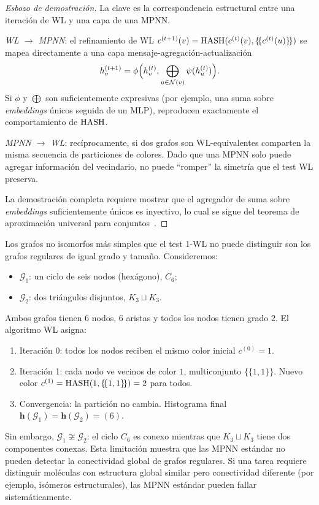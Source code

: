 \begin{proof}[Esbozo de demostraci\'on]
La clave es la correspondencia estructural entre una iteraci\'on de WL y una capa
de una MPNN.

\emph{WL $\to$ MPNN}: el refinamiento de WL
$c^{(t+1)}(v) = \operatorname{HASH}(c^{(t)}(v), \{\!\{c^{(t)}(u)\}\!\})$ se mapea directamente a
una capa mensaje-agregaci\'on-actualizaci\'on
\[
  h_v^{(t+1)} = \phi\Bigl(h_v^{(t)},
      \bigoplus_{u \in \mathcal{N}(v)} \psi(h_u^{(t)})\Bigr).
\]
Si $\phi$ y $\bigoplus$ son suficientemente expresivas (por ejemplo, una suma
sobre \emph{embeddings} \'unicos seguida de un MLP), reproducen exactamente el
comportamiento de $\operatorname{HASH}$.

\emph{MPNN $\to$ WL}: rec\'iprocamente, si dos grafos son WL-equivalentes
comparten la misma secuencia de particiones de colores. Dado que una MPNN solo
puede agregar informaci\'on del vecindario, no puede ``romper'' la simetr\'ia que
el test WL preserva.

La demostraci\'on completa requiere mostrar que el agregador de suma sobre
\emph{embeddings} suficientemente \'unicos es inyectivo, lo cual se sigue del
teorema de aproximaci\'on universal para conjuntos~\citep{zaheer2017deepsets}.
\qedhere
\end{proof}

\begin{example}
\label{ex:priors:wl-indistinguishable}
Los grafos no isomorfos m\'as simples que el test 1-WL no puede distinguir son los
grafos regulares de igual grado y tama\~no. Consideremos:
\begin{itemize}
\item $\mathcal{G}_1$: un ciclo de seis nodos (hex\'agono), $C_6$;
\item $\mathcal{G}_2$: dos tri\'angulos disjuntos, $K_3 \sqcup K_3$.
\end{itemize}
Ambos grafos tienen $6$ nodos, $6$ aristas y todos los nodos tienen grado $2$. El
algoritmo WL asigna:
\begin{enumerate}
\item Iteraci\'on 0: todos los nodos reciben el mismo color inicial
$c^{(0)} = 1$.
\item Iteraci\'on 1: cada nodo ve vecinos de color $1$, multiconjunto
$\{\!\{1, 1\}\!\}$. Nuevo color $c^{(1)} = \operatorname{HASH}(1, \{\!\{1, 1\}\!\}) = 2$ para
todos.
\item Convergencia: la partici\'on no cambia. Histograma final
$\mathbf{h}(\mathcal{G}_1) = \mathbf{h}(\mathcal{G}_2) = (6)$.
\end{enumerate}
Sin embargo, $\mathcal{G}_1 \not\cong \mathcal{G}_2$: el ciclo $C_6$ es conexo
mientras que $K_3 \sqcup K_3$ tiene dos componentes conexas. Esta limitaci\'on
muestra que las MPNN est\'andar no pueden detectar la conectividad global de
grafos regulares. Si una tarea requiere distinguir mol\'eculas con estructura
global similar pero conectividad diferente (por ejemplo, is\'omeros
estructurales), las MPNN est\'andar pueden fallar sistem\'aticamente.
\end{example}

